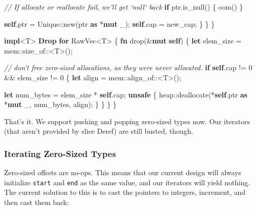 \documentclass[a4paper,]{book}
\newenvironment{Shaded}{\begin{snugshade}}{\end{snugshade}}
\newcommand{\KeywordTok}[1]{\textcolor[rgb]{0.13,0.29,0.53}{\textbf{{#1}}}}
\newcommand{\DecValTok}[1]{\textcolor[rgb]{0.00,0.00,0.81}{{#1}}}
\newcommand{\CommentTok}[1]{\textcolor[rgb]{0.56,0.35,0.01}{\textit{{#1}}}}
\newcommand{\NormalTok}[1]{{#1}}
\begin{document}
\begin{Shaded}
\begin{Highlighting}[]
            \CommentTok{// If allocate or reallocate fail, we'll get `null` back}
            \KeywordTok{if} \NormalTok{ptr.is_null() \{ oom() \}}

            \KeywordTok{self}\NormalTok{.ptr = Unique::new(ptr }\KeywordTok{as} \NormalTok{*}\KeywordTok{mut} \NormalTok{_);}
            \KeywordTok{self}\NormalTok{.cap = new_cap;}
        \NormalTok{\}}
    \NormalTok{\}}
\NormalTok{\}}

\KeywordTok{impl}\NormalTok{<T> }\KeywordTok{Drop} \KeywordTok{for} \NormalTok{RawVec<T> \{}
    \KeywordTok{fn} \NormalTok{drop(&}\KeywordTok{mut} \KeywordTok{self}\NormalTok{) \{}
        \KeywordTok{let} \NormalTok{elem_size = mem::size_of::<T>();}

        \CommentTok{// don't free zero-sized allocations, as they were never allocated.}
        \KeywordTok{if} \KeywordTok{self}\NormalTok{.cap != }\DecValTok{0} \NormalTok{&& elem_size != }\DecValTok{0} \NormalTok{\{}
            \KeywordTok{let} \NormalTok{align = mem::align_of::<T>();}

            \KeywordTok{let} \NormalTok{num_bytes = elem_size * }\KeywordTok{self}\NormalTok{.cap;}
            \KeywordTok{unsafe} \NormalTok{\{}
                \NormalTok{heap::deallocate(*}\KeywordTok{self}\NormalTok{.ptr }\KeywordTok{as} \NormalTok{*}\KeywordTok{mut} \NormalTok{_, num_bytes, align);}
            \NormalTok{\}}
        \NormalTok{\}}
    \NormalTok{\}}
\NormalTok{\}}
\end{Highlighting}
\end{Shaded}

That's it. We support pushing and popping zero-sized types now. Our
iterators (that aren't provided by slice Deref) are still busted,
though.

\subsubsection{Iterating Zero-Sized
Types}\label{iterating-zero-sized-types}

Zero-sized offsets are no-ops. This means that our current design will
always initialize \texttt{start} and \texttt{end} as the same value, and
our iterators will yield nothing. The current solution to this is to
cast the pointers to integers, increment, and then cast them back:
\end{document}
